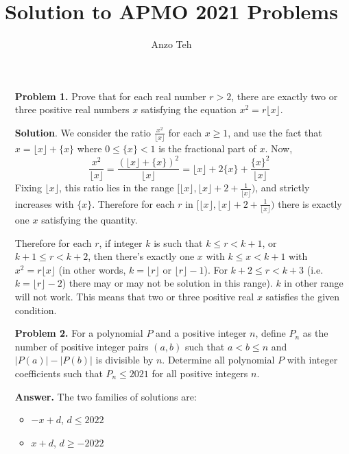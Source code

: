\documentclass[11pt,a4paper]{article}
\begin{document}
\newcommand{\la}{\leftarrow}
\newcommand{\lra}{\leftrightarrow}
\newcommand{\bbN}{\mathbb{N}}
\newcommand{\bbZ}{\mathbb{Z}}
\newcommand{\dsum}{\displaystyle\sum}
\newcommand{\dprod}{\displaystyle\prod}


\title{Solution to APMO 2021 Problems}
\author{Anzo Teh}
\date{}
\maketitle

\begin{enumerate}
	\item [\textbf{Problem 1.} ]Prove that for each real number $r>2$, there are exactly two or three positive real numbers $x$ satisfying the equation $x^2=r\lfloor x \rfloor$.
	
	\textbf{Solution}. We consider the ratio $\frac{x^2}{\lfloor x\rfloor}$ for each $x\ge 1$, and use the fact that $x=\lfloor x\rfloor +\{x\}$ where $0\le \{x\}<1$ is the fractional part of $x$. Now, 
	\[
	\frac{x^2}{\lfloor x\rfloor}=\frac{(\lfloor x\rfloor +\{x\})^2}{\lfloor x\rfloor} = \lfloor x\rfloor+2\{x\}+\frac{\{x\}^2}{\lfloor x\rfloor}
	\]
	Fixing $\lfloor x\rfloor$, this ratio lies in the range $[\lfloor x\rfloor, \lfloor x\rfloor+2+\frac{1}{\lfloor x\rfloor})$, and strictly increases with $\{x\}$. Therefore for each $r$ in $[\lfloor x\rfloor, \lfloor x\rfloor+2+\frac{1}{\lfloor x\rfloor})$ there is exactly one $x$ satisfying the quantity. 
	
	Therefore for each $r$, if integer $k$ is such that $k\le r< k+1$, or $k+1\le r<k+2$, then there's exactly one $x$ with $k\le x<k+1$ with $x^2=r\lfloor x\rfloor$ (in other words, $k=\lfloor r\rfloor$ or $\lfloor r\rfloor-1$). For $k+2\le r<k+3$ (i.e. $k=\lfloor r\rfloor-2$) there may or may not be solution in this range). $k$ in other range will not work. This means that two or three positive real $x$ satisfies the given condition. 
	
	\item [\textbf{Problem 2.}] For a polynomial $P$ and a positive integer $n$, define $P_n$ as the number of positive integer pairs $(a,b)$ such that $a<b \leq n$ and $|P(a)|-|P(b)|$ is divisible by $n$. Determine all polynomial $P$ with integer coefficients such that $P_n \leq 2021$ for all positive integers $n$.
	
	\textbf{Answer.} The two families of solutions are: 
	
	\begin{itemize}
		\item $-x+d$, $d\le 2022$
		\item $x+d$, $d\ge -2022$
	\end{itemize}


\end{enumerate}
\end{document}
